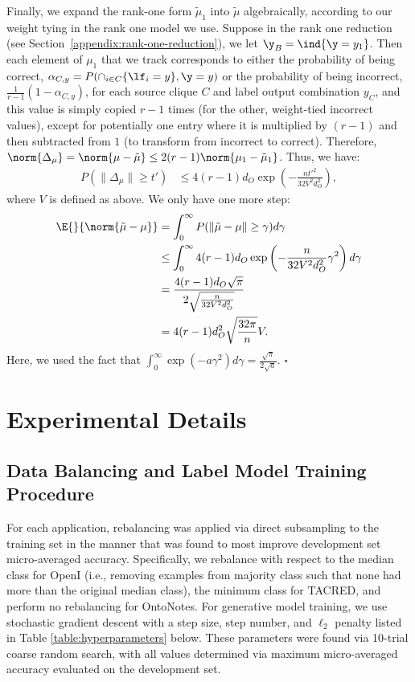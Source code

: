 \documentclass[letterpaper]{article}
\begin{document}
\begin{appendix}
Finally, we expand the rank-one form $\tilde{\mu}_1$ into $\tilde{\mu}$ algebraically, according to our weight tying in the rank one model we use.
Suppose in the rank one reduction (see Section~\ref{appendix:rank-one-reduction}), we let $\y_B = \ind{ \y = y_1 }$.
Then each element of $\mu_1$ that we track corresponds to either the probability of being correct, $\alpha_{C,y} = P(\cap_{i\in C}\{\lf_i = y\}, \y=y)$ or the probability of being incorrect, $\frac{1}{r-1}(1-\alpha_{C,y})$, for each source clique $C$ and label output combination $y_C$, and this value is simply copied $r-1$ times (for the other, weight-tied incorrect values), except for potentially one entry where it is multiplied by $(r-1)$ and then subtracted from $1$ (to transform from incorrect to correct).
Therefore, $\norm{\Delta_\mu} = \norm{ \mu - \tilde{\mu} } \leq 2(r-1) \norm{ \mu_1 - \tilde{\mu}_1 }$.
Thus, we have:
\begin{align*} 
	P(\|\Delta_{\mu}\| \geq t')
	&\leq
	4(r-1)d_O \exp \left( -\frac{nt'^2}{32V^2d_O^2} \right),
\end{align*}
where $V$ is defined as above.
We only have one more step:
\begin{align*}
	\E{}{\norm{ \tilde{\mu} - \mu}}
	&=
	\int_{0}^{\infty} P(\|\tilde{\mu} - \mu\| \geq \gamma) d\gamma \\
	&\leq
	\int_{0}^{\infty} 4(r-1)d_O \exp \left( -\frac{n}{32V^2d_O^2} \gamma^2 \right)d\gamma \\
	&=
	\frac{4(r-1)d_O \sqrt{\pi}}{2 \sqrt{\frac{n}{32V^2d_O^2}}} \\
	&=
	4(r-1)d_O^2 \sqrt{\frac{32 \pi}{n}}V.
\end{align*}
Here, we used the fact that $\int_0^{\infty} \exp(-a\gamma^2) d\gamma = \frac{\sqrt{\pi}}{2 \sqrt{a}}$. \hfill $\square$
 
\section{Experimental Details}
  \label{appendix:exp_details}
  

\subsection{Data Balancing and Label Model Training Procedure}
For each application, rebalancing was applied via direct subsampling to the training set in the manner that was found to most improve development set micro-averaged accuracy.  Specifically, we rebalance with respect to the median class for OpenI (i.e., removing examples from majority class such that none had more than the original median class), the minimum class for TACRED, and perform no rebalancing for OntoNotes.  For generative model training, we use stochastic gradient descent with a step size, step number, and $\ell_2$ penalty listed in Table \ref{table:hyperparameters} below.  These parameters were found via 10-trial coarse random search, with all values determined via maximum micro-averaged accuracy evaluated on the development set. 


\end{appendix}
\end{document}
